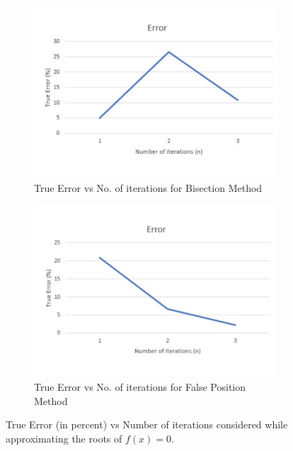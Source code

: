 \documentclass[titlepage, 11pt]{article}
\begin{document}
\begin{figure}[ht]
\begin{subfigure}{.5\textwidth}
  \centering
  \includegraphics[width=\linewidth]{TrueError1a.pdf}
  \caption{True Error vs No. of iterations for Bisection Method}
  \label{fig:fig82a}
\end{subfigure}
\begin{subfigure}{.5\textwidth}
  \centering
  \includegraphics[width=\linewidth]{TrueError1b.pdf}
  \caption{True Error vs No. of iterations for False Position Method}
  \label{fig:fig82b}
\end{subfigure}
\caption{True Error (in percent) vs Number of iterations considered while approximating the roots of $f(x)=0$.}
\label{fig:q81}
\end{figure}
\end{document}
